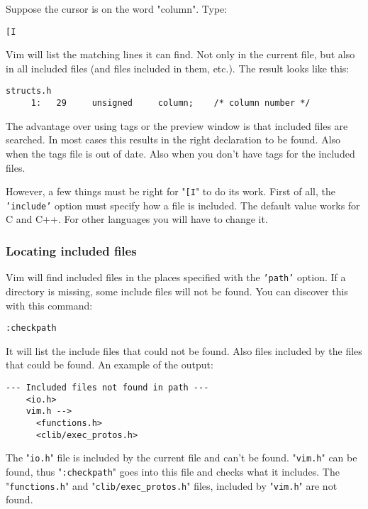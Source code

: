Suppose the cursor is on the word "column".
Type:

\begin{Verbatim}[samepage=true]
 [I
\end{Verbatim}

Vim will list the matching lines it can find.
Not only in the current file, but also in all included files (and files included in them, etc.).
The result looks like this:

\begin{Verbatim}[samepage=true]
    structs.h 
     1:   29     unsigned     column;    /* column number */ 
\end{Verbatim}

The advantage over using tags or the preview window is that included files are searched.
In most cases this results in the right declaration to be found.
Also when the tags file is out of date.
Also when you don't have tags for the included files.

However, a few things must be right for "\texttt{[I}" to do its work.
First of all, the \texttt{'include'} option must specify how a file is included.
The default value works for C and C++.
For other languages you will have to change it.
\subsubsection{Locating included files}
Vim will find included files in the places specified with the \texttt{'path'} option.
If a directory is missing, some include files will not be found.
You can discover this with this command:

\begin{Verbatim}[samepage=true]
 :checkpath
\end{Verbatim}

It will list the include files that could not be found.
Also files included by the files that could be found.
An example of the output:

\begin{Verbatim}[samepage=true]
    --- Included files not found in path --- 
    <io.h> 
    vim.h --> 
      <functions.h> 
      <clib/exec_protos.h> 
\end{Verbatim}

The "\texttt{io.h}" file is included by the current file and can't be found.
"\texttt{vim.h}" can be found, thus "\texttt{:checkpath}" goes into this file and checks what it includes.
The "\texttt{functions.h}" and "\texttt{clib/exec\_protos.h}" files, included by "\texttt{vim.h}" are not found.

